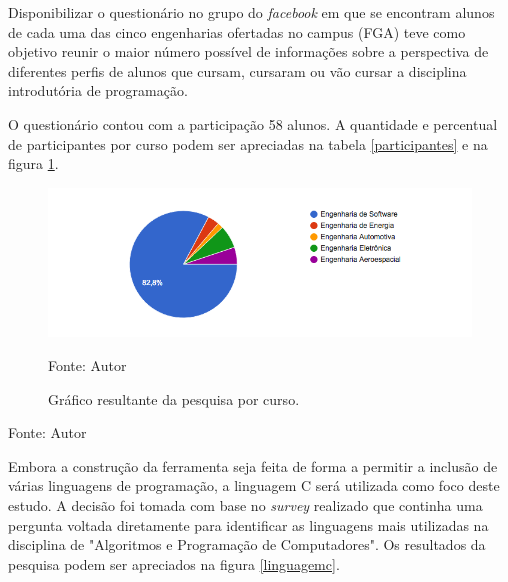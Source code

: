 Disponibilizar o questionário no grupo do \textit{facebook} em que se encontram alunos de cada uma das cinco engenharias ofertadas no campus (FGA)
teve como objetivo reunir o maior número possível de informações sobre a perspectiva de diferentes perfis de alunos que cursam, cursaram ou vão
cursar a disciplina introdutória de programação.

O questionário contou com a participação 58 alunos. A quantidade e percentual de participantes por curso podem ser apreciadas na tabela \ref{participantes} e
na figura \ref{graficocurso}.

\begin{figure}[h]
	\centering
	\includegraphics[keepaspectratio=true,scale=0.75]{figuras/graficocurso.png}
	\caption{Gráfico resultante da pesquisa por curso.}
	Fonte: {Autor}
	\label{graficocurso}
\end{figure}


\begin{table}[h]
	\centering
	\caption{Participação no questionário}
	\label{participantes}
	Fonte: {Autor}
\end{table}

Embora a construção da ferramenta seja feita de forma a permitir a inclusão de várias linguagens de programação, a linguagem C será
utilizada como foco deste estudo. A decisão foi tomada com base no \textit{survey} realizado que continha uma pergunta voltada diretamente
para identificar as linguagens mais utilizadas na disciplina de "Algoritmos e Programação de Computadores". Os resultados da pesquisa podem
ser apreciados na figura \ref{linguagemc}.


